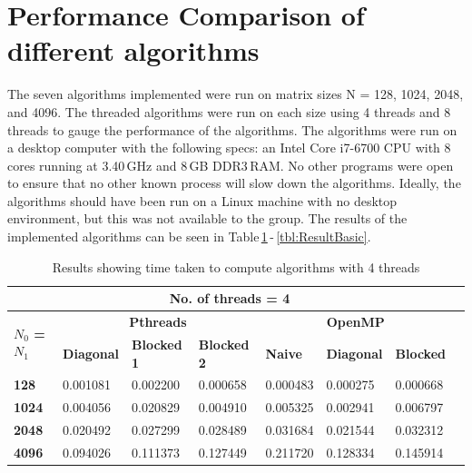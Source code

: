 \documentclass[10pt, onecolumn]{article}
\begin{document}
\section{Performance Comparison of different algorithms}
The seven algorithms implemented were run on matrix sizes N = 128, 1024, 2048, and 4096. The threaded algorithms were run on each size using 4 threads and 8 threads to gauge the performance of the algorithms. The algorithms were run on a desktop computer with the following specs: an Intel Core i7-6700 CPU with 8\,cores running at 3.40\,GHz and 8\,GB DDR3\,RAM. No other programs were open to ensure that no other known process will slow down the algorithms. Ideally, the algorithms should have been run on a Linux machine with no desktop environment, but this was not available to the group. The results of the implemented algorithms can be seen in Table\,\ref{tbl:Results4Threads}\,-\,\ref{tbl:ResultBasic}.
%
\begin{table}[H]
    \vspace{-0.5cm}
    \centering
    \caption{Results showing time taken to compute algorithms with 4 threads}
    \label{tbl:Results4Threads}
    \begin{tabular}{|l|l|l|l|l|l|l|l|}
    \hline
    \multicolumn{7}{|c|}{\textbf{No. of threads = 4}} \\ \hline
    \multirow{2}{*}{\textbf{$N_0$ = $N_1$}} & \multicolumn{3}{c|}{\textbf{Pthreads}} & \multicolumn{3}{c|}{\textbf{OpenMP}} \\ \cline{2-7} 
    & \textbf{Diagonal} & \textbf{Blocked 1} & \textbf{Blocked 2} & \textbf{Naive} & \textbf{Diagonal} & \textbf{Blocked} \\ \hline
    \textbf{128}  &0.001081  &0.002200  &0.000658  &0.000483  &0.000275  &0.000668  \\ \hline
    \textbf{1024} &0.004056  &0.020829  &0.004910  &0.005325  &0.002941  &0.006797  \\ \hline
    \textbf{2048} &0.020492  &0.027299  &0.028489  &0.031684  &0.021544  &0.032312  \\ \hline
    \textbf{4096} &0.094026  &0.111373  &0.127449  &0.211720  &0.128334  &0.145914  \\ \hline
    \end{tabular}
\end{table}
%
\end{document}
